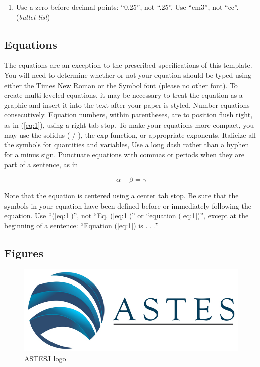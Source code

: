 \documentclass{article} %
\renewcommand{\headrulewidth}{0pt }
\begin{document}
\begin{multicols}{2}
\begin{enumerate}
\item  Use a zero before decimal points: ``0.25'', not ``.25''. Use ``cm3'', not ``cc''. (\textit{bullet list})
\end{enumerate}


\subsection{Equations}

The equations are an exception to the prescribed specifications of this template. You will need to determine whether or not your equation should be typed using either the Times New Roman or the Symbol font (please no other font). To create multi-leveled equations, it may be necessary to treat the equation as a graphic and insert it into the text after your paper is styled.
Number equations consecutively. Equation numbers, within parentheses, are to position flush right, as in (\ref{eq:1}), using a right tab stop. To make your equations more compact, you may use the solidus ( / ), the exp function, or appropriate exponents. Italicize all the symbols for quantities and variables, Use a long dash rather than a hyphen for a minus sign. Punctuate equations with commas or periods when they are part of a sentence, as in

\begin{equation}
\label{eq:1}
\alpha+\beta=\gamma
\end{equation}

Note that the equation is centered using a center tab stop. Be sure that the symbols in your equation have been defined before or immediately following the equation. Use ``(\ref{eq:1})'', not ``Eq. (\ref{eq:1})'' or ``equation (\ref{eq:1})'', except at the beginning of a sentence: ``Equation (\ref{eq:1}) is . . .''



\fancyhead{}
\renewcommand{\headrulewidth}{1pt }
\fancyfoot{}
\fancyfoot[R]{\thepage}

\subsection{Figures}

\begin{figure}[H]
	\centering
	\includegraphics[width=\linewidth]{images/ASTES_Logo.jpg}
	\caption{\footnotesize{ASTESJ logo}}    
		\label{astesj}
	\end{figure}


\end{multicols}
\end{document}

